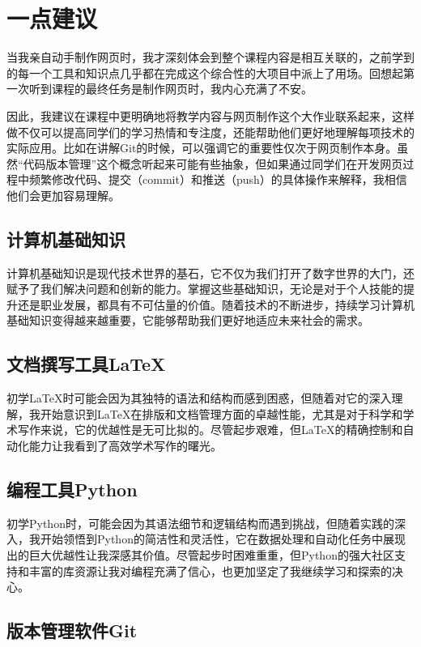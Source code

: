 \documentclass[supercite]{Experimental_Report}
\theoremstyle{definition}
\begin{document}
\newpage

\section{一点建议}

当我亲自动手制作网页时，我才深刻体会到整个课程内容是相互关联的，之前学到的每一个工具和知识点几乎都在完成这个综合性的大项目中派上了用场。回想起第一次听到课程的最终任务是制作网页时，我内心充满了不安。

因此，我建议在课程中更明确地将教学内容与网页制作这个大作业联系起来，这样做不仅可以提高同学们的学习热情和专注度，还能帮助他们更好地理解每项技术的实际应用。比如在讲解Git的时候，可以强调它的重要性仅次于网页制作本身。虽然“代码版本管理”这个概念听起来可能有些抽象，但如果通过同学们在开发网页过程中频繁修改代码、提交（commit）和推送（push）的具体操作来解释，我相信他们会更加容易理解。

\subsection{计算机基础知识}

计算机基础知识是现代技术世界的基石，它不仅为我们打开了数字世界的大门，还赋予了我们解决问题和创新的能力。掌握这些基础知识，无论是对于个人技能的提升还是职业发展，都具有不可估量的价值。随着技术的不断进步，持续学习计算机基础知识变得越来越重要，它能够帮助我们更好地适应未来社会的需求。

\subsection{文档撰写工具LaTeX}

初学LaTeX时可能会因为其独特的语法和结构而感到困惑，但随着对它的深入理解，我开始意识到LaTeX在排版和文档管理方面的卓越性能，尤其是对于科学和学术写作来说，它的优越性是无可比拟的。尽管起步艰难，但LaTeX的精确控制和自动化能力让我看到了高效学术写作的曙光。

\subsection{编程工具Python}

初学Python时，可能会因为其语法细节和逻辑结构而遇到挑战，但随着实践的深入，我开始领悟到Python的简洁性和灵活性，它在数据处理和自动化任务中展现出的巨大优越性让我深感其价值。尽管起步时困难重重，但Python的强大社区支持和丰富的库资源让我对编程充满了信心，也更加坚定了我继续学习和探索的决心。

\subsection{版本管理软件Git}
\end{document}
